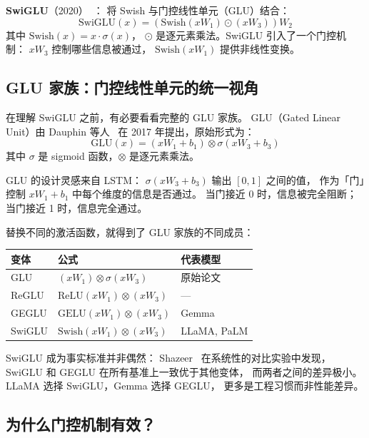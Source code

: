 \textbf{SwiGLU}（2020）~\cite{shazeer2020glu}：
将 Swish 与门控线性单元（GLU）结合：
\begin{equation}
  \mathrm{SwiGLU}(x) = \left(\mathrm{Swish}(x W_1) \odot (x W_3)\right) W_2
\end{equation}
其中 $\mathrm{Swish}(x) = x \cdot \sigma(x)$，
$\odot$ 是逐元素乘法。SwiGLU 引入了一个门控机制：
$xW_3$ 控制哪些信息被通过，
$\mathrm{Swish}(xW_1)$ 提供非线性变换。

\subsection{GLU 家族：门控线性单元的统一视角}

在理解 SwiGLU 之前，有必要看看完整的 GLU 家族。
GLU（Gated Linear Unit）由 Dauphin 等人~\cite{dauphin2017glu}
在 2017 年提出，原始形式为：
\begin{equation}
  \mathrm{GLU}(x) = (x W_1 + b_1) \otimes \sigma(x W_3 + b_3)
\end{equation}
其中 $\sigma$ 是 sigmoid 函数，$\otimes$ 是逐元素乘法。

GLU 的设计灵感来自 LSTM：
$\sigma(xW_3 + b_3)$ 输出 $[0,1]$ 之间的值，
作为「门」控制 $xW_1 + b_1$ 中每个维度的信息是否通过。
当门接近 0 时，信息被完全阻断；
当门接近 1 时，信息完全通过。

替换不同的激活函数，就得到了 GLU 家族的不同成员：

\begin{center}\small
\renewcommand{\arraystretch}{1.3}
\begin{tabular}{lll}
\toprule
\rowcolor{figLightGray}
\textbf{变体} & \textbf{公式} & \textbf{代表模型} \\
\midrule
GLU & $(xW_1) \otimes \sigma(xW_3)$ & 原始论文 \\
ReGLU & $\mathrm{ReLU}(xW_1) \otimes (xW_3)$ & --- \\
GEGLU & $\mathrm{GELU}(xW_1) \otimes (xW_3)$ & Gemma \\
SwiGLU & $\mathrm{Swish}(xW_1) \otimes (xW_3)$ & LLaMA, PaLM \\
\bottomrule
\end{tabular}
\end{center}

SwiGLU 成为事实标准并非偶然：
Shazeer~\cite{shazeer2020glu} 在系统性的对比实验中发现，
SwiGLU 和 GEGLU 在所有基准上一致优于其他变体，
而两者之间的差异极小。
LLaMA 选择 SwiGLU，Gemma 选择 GEGLU，
更多是工程习惯而非性能差异。

\subsection{为什么门控机制有效？}

